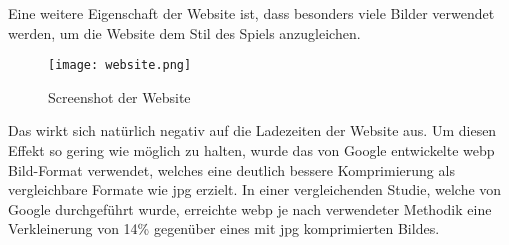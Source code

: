 Eine weitere Eigenschaft der \FF Website ist, dass besonders viele Bilder verwendet werden, um die Website dem Stil des
Spiels anzugleichen.

\begin{figure}[H]
    \centering
    \texttt{[image: website.png]}
    \caption{Screenshot der Website}
\end{figure}

Das wirkt sich natürlich negativ auf die Ladezeiten der Website aus.
Um diesen Effekt so gering wie möglich zu halten, wurde das von Google entwickelte webp Bild-Format verwendet, welches
eine deutlich bessere Komprimierung als vergleichbare Formate wie \zB jpg erzielt.
In einer vergleichenden Studie, welche von Google durchgeführt wurde, erreichte webp je nach verwendeter Methodik eine
Verkleinerung von 14\% gegenüber eines mit jpg komprimierten Bildes.

\renewcommand{\kapitelautor}{}
